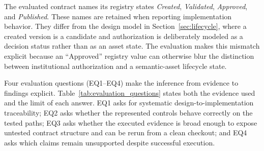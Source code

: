 \documentclass[journal]{IEEEtran}
\begin{document}
The evaluated contract names its registry states \emph{Created}, \emph{Validated}, \emph{Approved}, and \emph{Published}. These names are retained when reporting implementation behavior. They differ from the design model in Section~\ref{sec:lifecycle}, where a created version is a candidate and authorization is deliberately modeled as a decision status rather than as an asset state. The evaluation makes this mismatch explicit because an ``Approved'' registry value can otherwise blur the distinction between institutional authorization and a semantic-asset lifecycle state.

Four evaluation questions (EQ1--EQ4) make the inference from evidence to findings
explicit. Table~\ref{tab:evaluation_questions} states both the evidence used
and the limit of each answer. EQ1 asks for systematic design-to-implementation
traceability; EQ2 asks whether the represented controls behave correctly on
the tested paths; EQ3 asks whether the executed evidence is broad enough to
expose untested contract structure and can be rerun from a clean checkout; and
EQ4 asks which claims remain unsupported despite successful execution.
\end{document}
